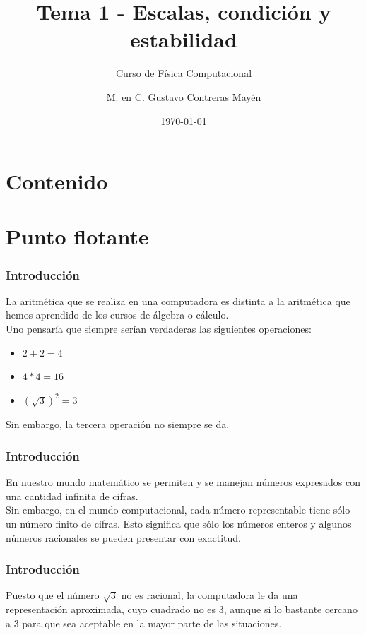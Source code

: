 
\title{\large{Tema 1 - Escalas, condición y estabilidad}}
\subtitle{Curso de Física Computacional}
\author[]{M. en C. Gustavo Contreras Mayén}
\date{\today}

\maketitle
\section*{Contenido}
\fontsize{14}{14}\selectfont
{}
\section{Punto flotante}
\begin{frame}
\frametitle{Introducción}
La aritmética que se realiza en una computadora es distinta a la aritmética que hemos aprendido de los cursos de álgebra o cálculo.
\\
\bigskip
\pause
Uno pensaría que siempre serían verdaderas las siguientes operaciones:
\begin{itemize}
\item $2 + 2 = 4$
\item $4 * 4 = 16$
\item $(\sqrt{3})^{2} = 3$
\end{itemize}
Sin embargo, la tercera  operación no siempre se da.
\end{frame}
\begin{frame}
\frametitle{Introducción}
En nuestro mundo matemático se permiten y se manejan  números expresados con una cantidad infinita de cifras.
\\
\bigskip
\pause
Sin embargo, en el mundo computacional, cada número representable tiene sólo un número finito de cifras. Esto significa que sólo los números enteros y algunos números racionales se pueden presentar con exactitud. 
\end{frame}
\begin{frame}
\frametitle{Introducción}
Puesto que el número $\sqrt{3}$ no es racional, la computadora le da una representación aproximada, cuyo cuadrado no es $3$, aunque si lo bastante cercano a $3$ para que sea aceptable en la mayor parte de las situaciones.
\end{frame}
